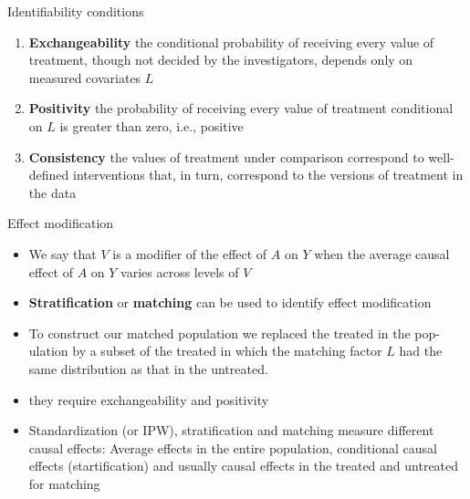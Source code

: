 \documentclass{beamer}
\begin{document}
\begin{frame}{Identifiability conditions}
	\begin{enumerate}
		\item<1-> \textbf{Exchangeability} the conditional probability 
			of receiving every value of treatment, though
			not decided by the investigators, depends only on measured covariates $L$
		\item<2-> \textbf{Positivity} the probability of 
			receiving every value of treatment conditional on $L$ is
			greater than zero, i.e., positive
		\item<3-> \textbf{Consistency} the values of treatment under comparison 
			correspond to well-defined interventions that, 
			in turn, correspond to the versions of treatment in the data
	\end{enumerate}
\end{frame}

\begin{frame}{Effect modification}

\begin{itemize}
	\item We say that $V$ is a modifier of the eﬀect of $A$ on $Y$ 
		when the average causal eﬀect of $A$ on $Y$ varies across levels of $V$
	\item \textbf{Stratification} or \textbf{matching} can be used to identify effect modification
	\item<2-> To construct our matched population we replaced the treated in the pop-
ulation by a subset of the treated in which the matching factor $L$ had the
same distribution as that in the untreated.
	\item<3-> they require exchangeability and positivity 
	\item<4-> Standardization (or IPW), stratification and matching measure different 
		causal effects: Average effects in the entire population, conditional causal effects (startification) and usually causal effects in the treated and untreated for matching  
\end{itemize}

\end{frame}
\end{document}
